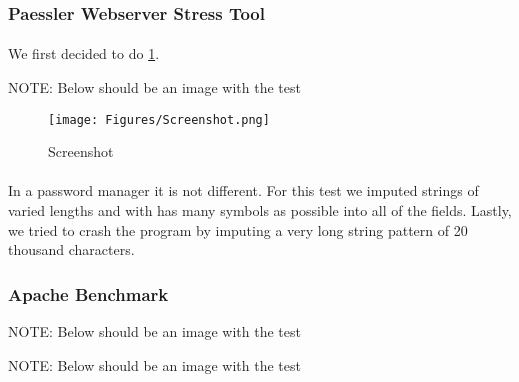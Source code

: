 \subsubsection{Paessler Webserver Stress Tool}
\paragraph{}
We first decided to do \ref{fig:QQ3}.

NOTE: Below should be an image with the test 

\begin{figure}[H]
    \centering
    \texttt{[image: Figures/Screenshot.png]}
    \caption{Screenshot}
    \label{fig:QQ3}
\end{figure}
\paragraph{}
In a password manager it is not different. For this test we imputed strings of varied lengths and with has many symbols as possible into all of the fields. Lastly, we tried to crash the program by imputing a very long string pattern of 20 thousand characters.

\subsubsection{Apache Benchmark}

NOTE: Below should be an image with the test 

NOTE: Below should be an image with the test 
